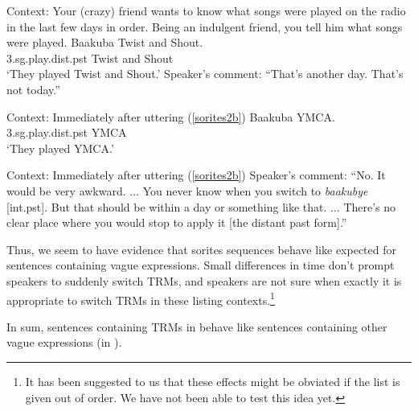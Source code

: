 \documentclass[output=paper,
modfonts
]{langscibook}
\begin{document}
\ea\label{sorites2a}
\ea\label{sorites2}
Context: Your (crazy) friend wants to know what songs were played on the radio in the last few days in order. Being an indulgent friend, you tell him what songs were played.
\ex\label{sorites2b}
 \gll Baakuba Twist and Shout. \\
{\sc 3.sg}.play{\sc.dist.pst} Twist and Shout \\
\glt `They played Twist and Shout.'
\ex Speaker's comment: ``That's another day. That's not today.''
\z
\z

\ea
\ea Context: Immediately after uttering (\ref{sorites2b})
\ex  \gll Baakuba YMCA. \\
{\sc 3.sg}.play{\sc.dist.pst} YMCA \\
\glt `They played YMCA.'
\z
\z

\ea\label{sorites3}
\ea Context: Immediately after uttering (\ref{sorites2b})
\ex Speaker's comment: ``No. It would be very awkward. $\dots$ You never know when you switch to {\it baakubye} [{\sc int.pst}]. But that should be within a day or something like that. $\dots$ There's no clear place where you would stop to apply it [the distant past form].''
\z
\z

Thus, we seem to have evidence that sorites sequences behave like expected for sentences containing vague expressions.  Small differences in time don't prompt speakers to suddenly switch TRMs, and speakers are not sure when exactly it is appropriate to switch TRMs in these listing contexts.\footnote{It has been suggested to us that these effects might be obviated if the list is given out of order. We have not been able to test this idea yet.} 

In sum, sentences containing TRMs in  behave like sentences containing other vague expressions (in ).



\end{document}
